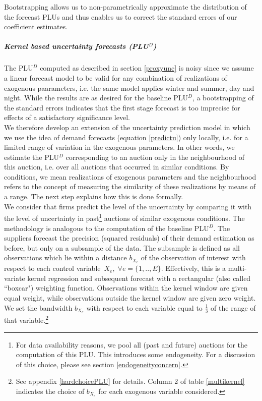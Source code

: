 Bootstrapping allows us to non-parametrically approximate the distribution of the forecast PLUs and thus enables us to correct the standard errors of our coefficient estimates. 

\subparagraph{Kernel based uncertainty forecasts (PLU$^D$)}
\label{robustunc}

The PLU$^D$ computed as described in section \ref{proxyunc} is noisy since we assume a linear forecast model to be valid for any combination of realizations of exogenous paarameters, i.e. the same model applies winter and summer, day and night. 
While the results are as desired for the baseline PLU$^D$, a bootstrapping of the standard errors indicates that the first stage forecast is too imprecise for effects of a satisfactory significance level. \\

We therefore develop an extension of the uncertainty prediction model  in which we use the idea of demand forecasts (equation \ref{predictu}) only locally, i.e. for a limited range of variation in the exogenous parameters. In other words, we estimate the PLU$^D$ corresponding to an auction only in the neighbourhood of this auction, i.e. over all auctions that occurred in similar conditions. By conditions, we mean realizations of exogenous parameters and the neighbourhood refers to the concept of measuring the similarity of these realizations by means of a range. The next step explains how this is done formally. \\

We consider that firms predict the level of the uncertainty by comparing it with the level of uncertainty in past\footnote{For data availability reasons, we pool all (past and future) auctions for the computation of this PLU. This introduces some endogeneity. For a discussion of this choice, please see section \ref{endogeneityconcern}.} auctions of similar exogenous conditions. 
The methodology is analogous to the computation of the baseline PLU$^D$. The suppliers forecast the precision (squared residuals) of their demand estimation as before, but only on a subsample of the data. The subsample is defined as all observations which lie within a distance $b_{X_e}$ of the observation of interest with respect to each %
control variable~$X_e , \; \forall e=\{1,..,E\}$. Effectively, this is a multi-variate kernel regression and subsequent forecast with a rectangular (also called ``boxcar") weighting function. Observations within the kernel window are given equal weight, while observations outside the kernel window are given zero weight. We set the bandwidth $b_{X_e}$ with respect to each variable equal to $\frac{1}{3}$ of the range of that variable.\footnote{See appendix \ref{hardchoicePLU} for details. Column 2 of table \ref{multikernel} indicates the choice of $b_{X_e}$ for each exogenous variable considered.} \\

